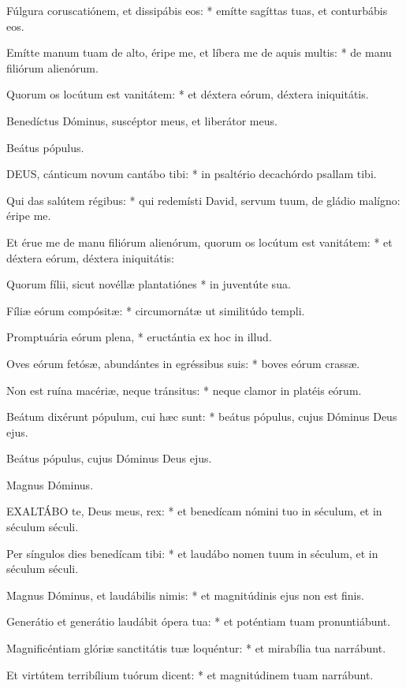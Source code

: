 Fúlgura coruscatiónem, et dissipábis eos: * emítte sagíttas tuas, et conturbábis eos.

Emítte manum tuam de alto, éripe me, et líbera me de aquis multis: * de manu filiórum alienórum.

Quorum os locútum est vanitátem: * et déxtera eórum, déxtera iniquitátis.

 Benedíctus Dóminus, suscéptor meus, et liberátor meus.

 Beátus pópulus.


\lettrine[lines=2]{D}{EUS}, cánticum novum cantábo tibi: * in psaltério decachórdo psallam tibi.

Qui das salútem régibus: * qui redemísti David, servum tuum, de gládio malígno: éripe me.

Et érue me de manu filiórum alienórum, quorum os locútum est vanitátem: * et déxtera eórum, déxtera iniquitátis:

Quorum fílii, sicut novéllæ plantatiónes * in juventúte sua.

Fíliæ eórum compósitæ: * circumornátæ ut similitúdo templi.

Promptuária eórum plena, * eructántia ex hoc in illud.

Oves eórum fetósæ, abundántes in egréssibus suis: * boves eórum crassæ.

Non est ruína macériæ, neque tránsitus: * neque clamor in platéis eórum.

Beátum dixérunt pópulum, cui hæc sunt: * beátus pópulus, cujus Dóminus Deus ejus.

 Beátus pópulus, cujus Dóminus Deus ejus.

 Magnus Dóminus.


\lettrine[lines=2]{E}{XALTÁBO} te, Deus meus, rex: * et benedícam nómini tuo in séculum, et in séculum séculi.

Per síngulos dies benedícam tibi: * et laudábo nomen tuum in séculum, et in séculum séculi.

Magnus Dóminus, et laudábilis nimis: * et magnitúdinis ejus non est finis.

Generátio et generátio laudábit ópera tua: * et poténtiam tuam pronuntiábunt.

Magnificéntiam glóriæ sanctitátis tuæ loquéntur: * et mirabília tua narrábunt.

Et virtútem terribílium tuórum dicent: * et magnitúdinem tuam narrábunt.

